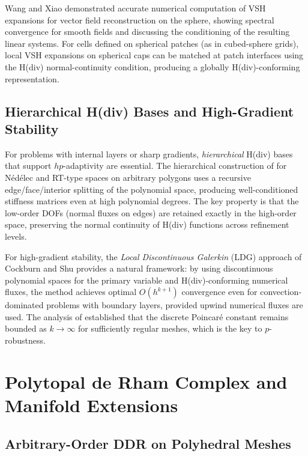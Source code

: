 Wang and Xiao \cite{wangVSH2017} demonstrated accurate numerical computation
of VSH expansions for vector field reconstruction on the sphere, showing
spectral convergence for smooth fields and discussing the conditioning of
the resulting linear systems. For cells defined on spherical patches
(as in cubed-sphere grids), local VSH expansions on spherical caps can be
matched at patch interfaces using the H(div) normal-continuity condition,
producing a globally H(div)-conforming representation.

\subsection{Hierarchical H(div) Bases and High-Gradient Stability}

For problems with internal layers or sharp gradients, \emph{hierarchical}
H(div) bases that support $hp$-adaptivity are essential. The hierarchical
construction of \cite{zaglmayrHierarchical2006} for N\'{e}d\'{e}lec and
RT-type spaces on arbitrary polygons uses a recursive edge/face/interior
splitting of the polynomial space, producing well-conditioned stiffness
matrices even at high polynomial degrees. The key property is that the
low-order DOFs (normal fluxes on edges) are retained exactly in the
high-order space, preserving the normal continuity of H(div) functions
across refinement levels.

For high-gradient stability, the \emph{Local Discontinuous Galerkin} (LDG)
approach of Cockburn and Shu \cite{cockburnLDG1998} provides a natural
framework: by using discontinuous polynomial spaces for the primary variable
and H(div)-conforming numerical fluxes, the method achieves optimal
$O(h^{k+1})$ convergence even for convection-dominated problems with
boundary layers, provided upwind numerical fluxes are used. The analysis of
\cite{ciarletStability2002} established that the discrete Poincar\'{e}
constant remains bounded as $k\to\infty$ for sufficiently regular meshes,
which is the key to $p$-robustness.

\section{Polytopal de Rham Complex and Manifold Extensions}

\subsection{Arbitrary-Order DDR on Polyhedral Meshes}

